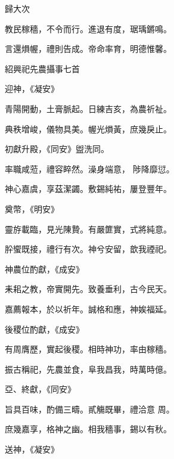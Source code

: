 \begin{pinyinscope}
 歸大次



 教民稼穡，不令而行。進退有度，琚瑀鏘鳴。



 言還熉幄，禮則告成。帝命率育，明德惟馨。



 紹興祀先農攝事七首



 迎神，《凝安》



 青陽開動，土膏脈起。日練吉亥，為農祈祉。



 典秩增峻，儀物具美。幄光熉黃，庶幾戾止。



 初獻升殿，《同安》盥洗同。



 率職咸蒞，禮容睟然。澡身端意，
 陟降靡愆。



 神心嘉虞，享茲潔蠲。敷錫純祐，屢登豐年。



 奠幣，《明安》



 靈斿載臨，見光陳贄。有嚴篚實，式將純意。



 肸蠁既接，禮行有次。神兮安留，歆我禋祀。



 神農位酌獻，《成安》



 耒耜之教，帝實開先。致養垂利，古今民天。



 嘉薦報本，於以祈年。誠格和應，神娭福延。



 後稷位酌獻，《成安》



 有周膺歷，實起後稷。相時神功，率由稼穡。



 振古稱祀，先農並食，阜我昌我，時萬時億。



 亞、終獻，《同安》



 旨具百味，酌備三疇。貳觴既畢，禮洽意
 周。



 庶幾嘉享，格神之幽。相我穡事，錫以有秋。



 送神，《凝安》




\end{pinyinscope}
